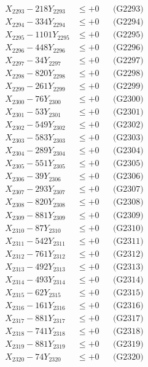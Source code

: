 \documentclass[a4paper,10pt]{article}
\begin{document}
{\begin{align}
X_{2293} - 218Y_{2293} &\leq +0 && \text{(G2293)} \\
X_{2294} - 334Y_{2294} &\leq +0 && \text{(G2294)} \\
X_{2295} - 1101Y_{2295} &\leq +0 && \text{(G2295)} \\
X_{2296} - 448Y_{2296} &\leq +0 && \text{(G2296)} \\
X_{2297} - 34Y_{2297} &\leq +0 && \text{(G2297)} \\
X_{2298} - 820Y_{2298} &\leq +0 && \text{(G2298)} \\
X_{2299} - 261Y_{2299} &\leq +0 && \text{(G2299)} \\
X_{2300} - 76Y_{2300} &\leq +0 && \text{(G2300)} \\
\allowbreak
X_{2301} - 53Y_{2301} &\leq +0 && \text{(G2301)} \\
X_{2302} - 549Y_{2302} &\leq +0 && \text{(G2302)} \\
X_{2303} - 583Y_{2303} &\leq +0 && \text{(G2303)} \\
X_{2304} - 289Y_{2304} &\leq +0 && \text{(G2304)} \\
X_{2305} - 551Y_{2305} &\leq +0 && \text{(G2305)} \\
X_{2306} - 39Y_{2306} &\leq +0 && \text{(G2306)} \\
X_{2307} - 293Y_{2307} &\leq +0 && \text{(G2307)} \\
X_{2308} - 820Y_{2308} &\leq +0 && \text{(G2308)} \\
X_{2309} - 881Y_{2309} &\leq +0 && \text{(G2309)} \\
X_{2310} - 87Y_{2310} &\leq +0 && \text{(G2310)} \\
\allowbreak
X_{2311} - 542Y_{2311} &\leq +0 && \text{(G2311)} \\
X_{2312} - 761Y_{2312} &\leq +0 && \text{(G2312)} \\
X_{2313} - 492Y_{2313} &\leq +0 && \text{(G2313)} \\
X_{2314} - 493Y_{2314} &\leq +0 && \text{(G2314)} \\
X_{2315} - 62Y_{2315} &\leq +0 && \text{(G2315)} \\
X_{2316} - 161Y_{2316} &\leq +0 && \text{(G2316)} \\
X_{2317} - 881Y_{2317} &\leq +0 && \text{(G2317)} \\
X_{2318} - 741Y_{2318} &\leq +0 && \text{(G2318)} \\
X_{2319} - 881Y_{2319} &\leq +0 && \text{(G2319)} \\
X_{2320} - 74Y_{2320} &\leq +0 && \text{(G2320)} \\

\end{align}}
\end{document}
